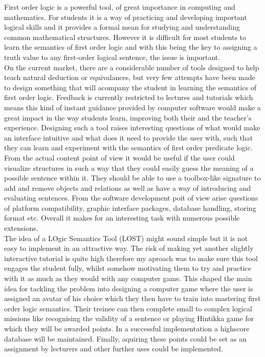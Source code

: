 \documentclass{article}
\begin{document}
First order logic is a powerful tool, of great importance in computing and mathematics. For students it is a way of practicing and developing important logical skills and it provides a formal mean for studying and understanding common mathematical structures. However it is difficult for most students to learn the semantics of first order logic and with this being the key to assigning a truth value to any first-order logical sentence, the issue is important.\\

\noindent On the current market, there are a considerable number of tools designed to help teach natural deduction or equivalances, but very few attempts have been made to design something that will acompany the student in learning the semantics of first order logic. Feedback is currently restricted to lectures and tutorials which means this kind of instant guidance provided by computer software would make a great impact in the way students learn, improving both their and the teacher's experience. Designing such a tool raises interesting questions of what would make an interface intuitive and what does it need to provide the user with, such that they can learn and experiment with the semantics of first order predicate logic. From the actual content point of view it would be useful if the user could visualize structures in such a way that they could easily guess the meaning of a possible sentence within it. They should be able to use a toolbox-like signature to add and remove objects and relations as well as have a way of introducing and evaluating sentences. From the software development poit of view arise questions of platform compatibility, graphic interface packages, database handling, storing format etc. Overall it makes for an interesting task with numerous possible extensions.\\

\noindent The idea of a LOgic Semantics Tool (LOST) might sound simple but it is not easy to implement in an attractive way. The risk of making yet another slightly interactive tutorial is quite high therefore my aproach was to make sure this tool engages the student fully, whilst somehow motivating them to try and practice with it as much as they would with any computer game. This shaped the main idea for tackling the problem into designing a computer game where the user is assigned an avatar of his choice which they then have to train into mastering first order logic semantics. Their treinee can then complete small to complex logical missions like recognising the validity of a sentence or playing Hintikka game for which they will be awarded points. In a successful implementation a highscore database will be maintained. Finally, aquiring these points could be set as an assignment by lecturers and other further uses could be implemented.\\
\end{document}
